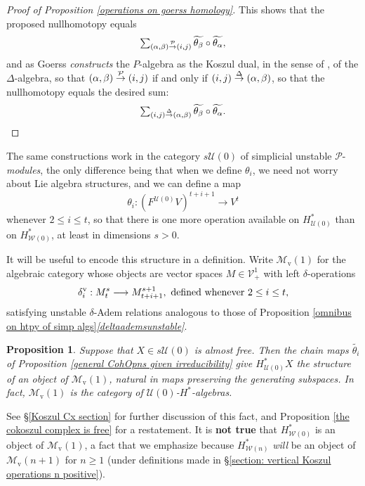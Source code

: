 \documentclass[11pt]{amsart} \renewcommand{\baselinestretch}{1.2}
\theoremstyle{plain}
\newtheorem{prop}[thm]{Proposition}
\numberwithin{equation}{section} %
\theoremstyle{plain}
\newtheorem{prop}[thm]{Proposition}
\numberwithin{equation}{chapter} %
\renewcommand{\to}{\longrightarrow}
\newcommand{\calU}{\mathcal{U}}
\newcommand{\calP}{\mathcal{P}}
\newcommand{\calV}{\mathcal{V}}
\newcommand{\calw}{\mathcal{W}}
\newcommand{\calMv}{\mathcal{M}\dver}
\newcommand{\Palg}{{\calP}}
\newcommand{\vect}[2]{\calV^{#1}_{#2}}
\newcommand{\produces}[3]{#3:#1\sim #2}
\renewcommand{\produces}[3]{#1\rightarrow_{#3} #2}%
\renewcommand{\produces}[3]{#1\overset{\smash{#3}}{\rightarrow} #2}%
\newcommand{\uver}{^\mathrm{v}}
\newcommand{\dver}{_\mathrm{v}}
\newcommand{\deltav}{\delta\uver}
\begin{document}
\begin{Cohomology Operations for W and U}
\begin{proof}[Proof of Proposition \ref{operations on goerss homology}]
This shows that the proposed nullhomotopy equals  
\[\textstyle\sum_{\produces{(\alpha,\beta)}{(i,j)}{\Palg}}\widetilde{\theta_\beta}\circ\widetilde{\theta_\alpha},\]
 and as Goerss \cite{MR1089001} \emph{constructs} the $P$-algebra as the Koszul dual, in the sense of \cite{PriddyKoszul.pdf}, of the $\Delta$-algebra, so that $\produces{(\alpha,\beta)}{(i,j)}{\Palg}$ if and only if $\produces{(i,j)}{(\alpha,\beta)}{\Delta}$, so that the nullhomotopy equals the desired sum:
\[\textstyle\sum_{\produces{(i,j)}{(\alpha,\beta)}{\Delta}}\widetilde{\theta_\beta}\circ\widetilde{\theta_\alpha}.\qedhere\]
\end{proof}
The same constructions work in the category $s\calU(0)$ of simplicial unstable $\Palg$-\emph{modules}, the only difference being that when we define $\theta_i$, we need not worry about Lie algebra structures, and we can define a map
\[\theta_i:(F^{\calU(0)}V)^{t+i+1}\to V^t\]
whenever $2\leq i\leq t$, so that there is one more operation available on $H^*_{\calU(0)}$ than on $H^*_{\calw(0)}$, at least  in dimensions $s>0$.

It will be useful to encode this structure in a definition. Write $\calMv(1)$ for the algebraic category whose objects are vector spaces $M\in\vect{1}{+}$ with left $\delta$-operations
\[\deltav_i:M^{s}_t\to M^{s+1}_{t+i+1},\textup{ defined whenever $2\leq i\leq t$,}\]
satisfying unstable $\delta$-Adem relations analogous to those of Proposition \ref{omnibus on htpy of simp algs}\emph{\ref{deltaademsunstable}}.
\begin{prop}
\label{operations on unstable P homology}
Suppose that $X\in s\calU(0)$ is almost free. Then the chain maps $\widetilde{\theta_i}$ of Proposition \ref{general CohOpns given irreducibility} give $H^*_{\calU(0)}X$ the structure of an object of $\calMv(1)$, natural in maps preserving the generating subspaces. In fact, $\calMv(1)$ is the category of $\calU(0)$-$H^*$-algebras.
\end{prop}
\noindent See \S\ref{Koszul Cx section} for further discussion of this fact, and Proposition \ref{the cokoszul complex is free} for a restatement. It is \textbf{not true} that $H^*_{\calw(0)}$ is an object of $\calMv(1)$, a fact that we emphasize because $H^*_{\calw(n)}$ \emph{will} be an object of $\calMv(n+1)$ for $n\geq 1$ (under definitions made in \S\ref{section: vertical Koszul operations n positive}).


\end{Cohomology Operations for W and U}
\end{document}
